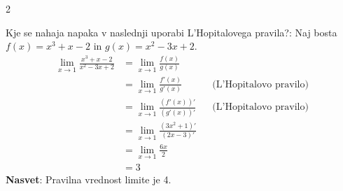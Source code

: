 \documentclass[11pt,a4paper]{exam}
\renewcommand{\{}{\lbrace}
\renewcommand{\}}{\rbrace}
\begin{document}
\begin{questions}
\begin{multicols}{2}
		\end{multicols}
	
		\question Kje se nahaja napaka v naslednji uporabi L'Hopitalovega pravila?:
		Naj bosta $f(x) = x^3 + x - 2$ in $g(x)=x^2 - 3x + 2$.
		\begin{align*}
			\lim_{x\to 1} \frac{x^3 + x - 2}{x^2 - 3x + 2} &= \lim_{x\to 1} \frac{f(x)}{g(x)}\\
			&= \lim_{x\to 1} \frac{f'(x)}{g'(x)} && \text{(L'Hopitalovo pravilo)} \\
			&= \lim_{x\to 1} \frac{(f'(x))'}{(g'(x))'} && \text{(L'Hopitalovo pravilo)} \\
			&=\lim_{x\to 1} \frac{(3x^2 + 1)'}{(2x - 3)'}\\
			&=\lim_{x\to 1} \frac{6x}{2} \\
			&=3
		\end{align*}
		\textbf{Nasvet}: Pravilna vrednost limite je 4.



\end{questions}
\end{document}
